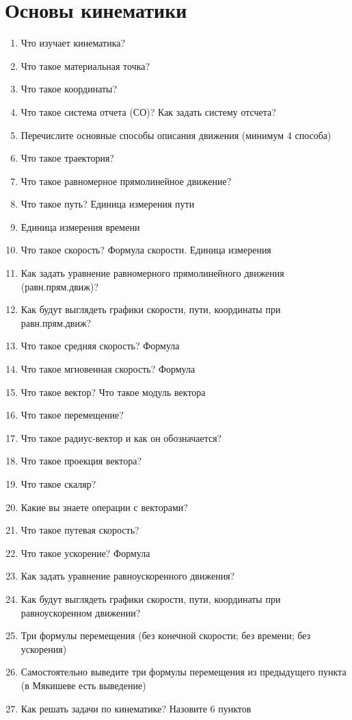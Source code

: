 \documentclass[12pt,a4paper]{report}
\begin{document}
\section{Основы кинематики}
\begin{enumerate}
\item Что изучает кинематика? 
\item Что такое материальная точка?
\item Что такое координаты?
\item Что такое система отчета (СО)? Как задать систему отсчета?
\item Перечислите основные способы описания движения (минимум 4 способа)
\item Что такое траектория?
\item Что такое равномерное прямолинейное движение?
\item Что такое путь? Единица измерения пути
\item Единица измерения времени
\item Что такое скорость? Формула скорости. Единица измерения
\item Как задать уравнение равномерного прямолинейного движения (равн.прям.движ)?
\item Как будут выглядеть графики скорости, пути, координаты при равн.прям.движ?
\item Что такое средняя скорость? Формула
\item Что такое мгновенная скорость? Формула
\item Что такое вектор? Что такое модуль вектора
\item Что такое перемещение?
\item Что такое радиус-вектор и как он обозначается?
\item Что такое проекция вектора?
\item Что такое скаляр?
\item Какие вы знаете операции с векторами?
\item Что такое путевая скорость?
\item Что такое ускорение? Формула
\item Как задать уравнение равноускоренного движения?
\item Как будут выглядеть графики скорости, пути, координаты при равноускоренном движении?
\item Три формулы перемещения (без конечной скорости; без времени; без ускорения)
\item Самостоятельно выведите три формулы перемещения из предыдущего пункта (в Мякишеве есть выведение) 
\item Как решать задачи по кинематике? Назовите 6 пунктов
\end{enumerate} 
\end{document}
